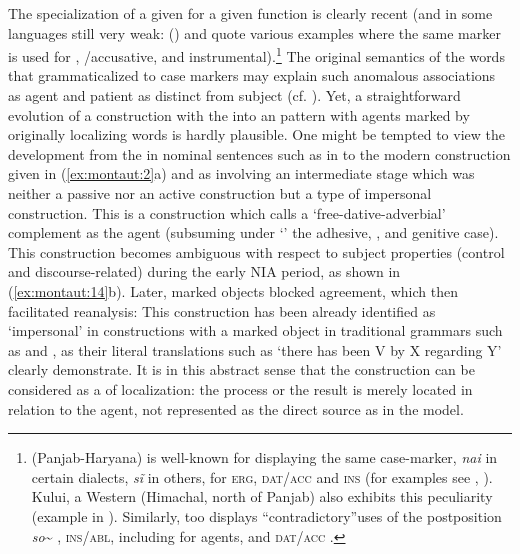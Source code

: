\documentclass[output=paper]{langsci/langscibook}
\begin{document}
The specialization of a given  for a given function is clearly recent (and in some languages still very weak: \citeauthor{Montaut2015} (\citeyear{Montaut2015,MontautInPress}) and \citet{Stroński2010} quote various examples where the same marker is used for , /accusative, and instrumental).\footnote{ (Panjab-Haryana) is well-known for displaying the same case-marker, \textit{nai} in certain dialects, \textit{s\~{i}} in others, for \textsc{erg}, \textsc{dat}/\textsc{acc} and \textsc{ins} (for examples see \citealt{Montaut2007}, \citealt{Montaut2015}). Kului, a Western  (Himachal, north of Panjab) also exhibits this peculiarity (example in \citealt{Stroński2014}). Similarly,  too displays “contradictory”{uses of the postposition} {\textit{so}{\textasciitilde}} , \textsc{ins}/\textsc{abl}, including for agents, and \textsc{dat}/\textsc{acc} \citep[30]{Jha1958}.} The original semantics of the words that grammaticalized to  case markers may explain such anomalous associations as agent and patient as distinct from subject (cf. \citealt{Malchukov2009}). Yet, a straightforward evolution of a construction with the  into an  pattern with agents marked by originally localizing words is hardly plausible. One might be tempted to view the development from the  in nominal sentences such as in  to the modern  construction given in (\ref{ex:montaut:2}a) and  as involving an intermediate stage which was neither a passive nor an active construction but a type of impersonal construction. This is a construction which \citet[374]{Seržant2012} calls a ‘free-dative-adverbial’ complement as the agent (subsuming under ‘’ the adhesive, ,  and genitive case). This construction becomes ambiguous with respect to subject properties (control and discourse-related) during the early NIA period, as shown in (\ref{ex:montaut:14}b). Later, marked objects blocked agreement, which then facilitated reanalysis: This construction has been already identified as ‘impersonal’ in constructions with a marked object in traditional grammars such as \citet{Kellogg1875} and \citet{Chatterji1926}, as their literal translations such as ‘there has been V by X regarding Y’ clearly demonstrate. It is in this abstract sense that the construction can be considered as a  of localization: the process or the result is merely located in relation to the agent, not represented as the direct source as in the  model. 
\end{document}
